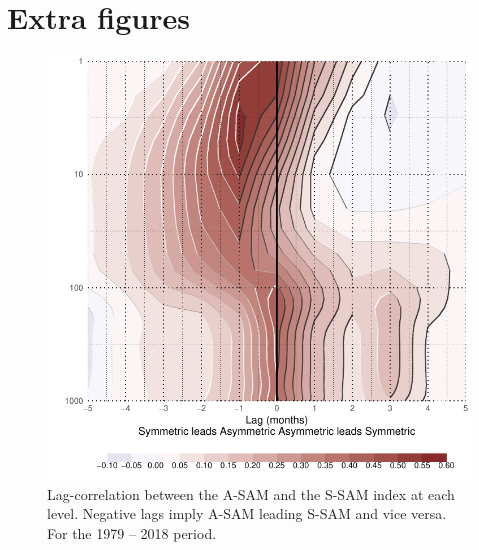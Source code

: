 \documentclass[smallextended]{svjour3}       %
\begin{document}
\newpage

\appendix


\hypertarget{extra-figures}{%
\section{Extra figures}\label{extra-figures}}

\newpage

\begin{figure}[ht]
\includegraphics{A1-1} \caption{Lag-correlation between the A\nobreakdash-SAM and the S\nobreakdash-SAM index at each level. Negative lags imply A\nobreakdash-SAM leading S\nobreakdash-SAM and vice versa. For the 1979 -- 2018 period.}\label{fig:A1}
\end{figure}
\end{document}
